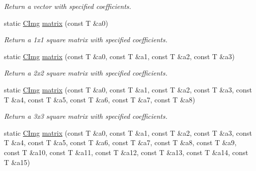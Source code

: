 \begin{DoxyCompactItemize}
\begin{DoxyCompactList}\small\item\em Return a vector with specified coefficients. \end{DoxyCompactList}\item 
\hypertarget{structcimg__library_1_1_c_img_a9038645f760c85dfb8efc26e54cf405a}{static \hyperlink{structcimg__library_1_1_c_img}{C\-Img} \hyperlink{structcimg__library_1_1_c_img_a9038645f760c85dfb8efc26e54cf405a}{matrix} (const T \&a0)}\label{structcimg__library_1_1_c_img_a9038645f760c85dfb8efc26e54cf405a}

\begin{DoxyCompactList}\small\item\em Return a 1x1 square matrix with specified coefficients. \end{DoxyCompactList}\item 
\hypertarget{structcimg__library_1_1_c_img_ac680cbdd04cf622f00023cf2f8c69259}{static \hyperlink{structcimg__library_1_1_c_img}{C\-Img} \hyperlink{structcimg__library_1_1_c_img_ac680cbdd04cf622f00023cf2f8c69259}{matrix} (const T \&a0, const T \&a1, const T \&a2, const T \&a3)}\label{structcimg__library_1_1_c_img_ac680cbdd04cf622f00023cf2f8c69259}

\begin{DoxyCompactList}\small\item\em Return a 2x2 square matrix with specified coefficients. \end{DoxyCompactList}\item 
\hypertarget{structcimg__library_1_1_c_img_a3f176b8e8c5019e2eaf49740524ae706}{static \hyperlink{structcimg__library_1_1_c_img}{C\-Img} \hyperlink{structcimg__library_1_1_c_img_a3f176b8e8c5019e2eaf49740524ae706}{matrix} (const T \&a0, const T \&a1, const T \&a2, const T \&a3, const T \&a4, const T \&a5, const T \&a6, const T \&a7, const T \&a8)}\label{structcimg__library_1_1_c_img_a3f176b8e8c5019e2eaf49740524ae706}

\begin{DoxyCompactList}\small\item\em Return a 3x3 square matrix with specified coefficients. \end{DoxyCompactList}\item 
\hypertarget{structcimg__library_1_1_c_img_a20598b5fe34408f4aea6530020e7e152}{static \hyperlink{structcimg__library_1_1_c_img}{C\-Img} \hyperlink{structcimg__library_1_1_c_img_a20598b5fe34408f4aea6530020e7e152}{matrix} (const T \&a0, const T \&a1, const T \&a2, const T \&a3, const T \&a4, const T \&a5, const T \&a6, const T \&a7, const T \&a8, const T \&a9, const T \&a10, const T \&a11, const T \&a12, const T \&a13, const T \&a14, const T \&a15)}\label{structcimg__library_1_1_c_img_a20598b5fe34408f4aea6530020e7e152}


\end{DoxyCompactItemize}

